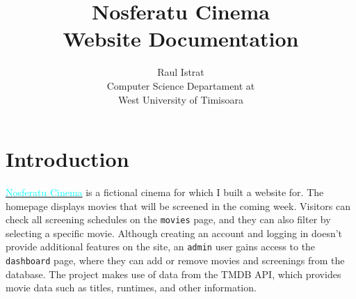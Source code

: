 \documentclass[a4paper]{article}
\title{Nosferatu Cinema\\Website Documentation}
\author{Raul Istrat\\
Computer Science Departament at\\
West University of Timisoara}
\begin{document}
\raggedright
\maketitle
\tableofcontents

\section*{Introduction}
    \href{https://github.com/domnu-raul/nosferatu-cinema/}{\textcolor{cyan}{Nosferatu Cinema}} is a fictional cinema for which I built a website for. The homepage displays movies that will be screened in the coming week. Visitors can check all screening schedules on the \texttt{movies} page, and they can also filter by selecting a specific movie. Although creating an account and logging in doesn't provide additional features on the site, an \texttt{admin} user gains access to the \texttt{dashboard} page, where they can add or remove movies and screenings from the database. The project makes use of data from the TMDB API, which provides movie data such as titles, runtimes, and other information.
\end{document}
